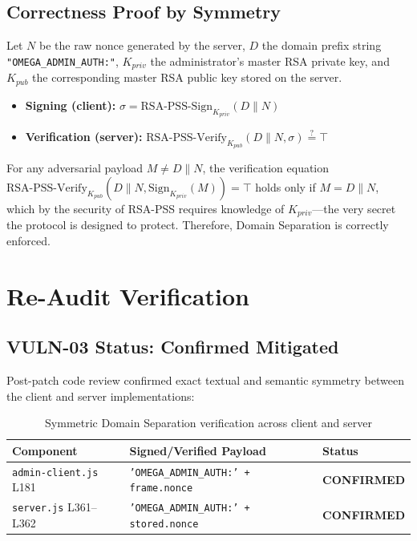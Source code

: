 \documentclass[12pt,a4paper]{article}
\begin{document}
\subsection{Correctness Proof by Symmetry}

Let $N$ be the raw nonce generated by the server, $D$ the domain prefix string \texttt{"OMEGA\_ADMIN\_AUTH:"}, $K_{priv}$ the administrator's master RSA private key, and $K_{pub}$ the corresponding master RSA public key stored on the server.

\begin{itemize}
    \item \textbf{Signing (client):} $\sigma = \text{RSA-PSS-Sign}_{K_{priv}}(D \| N)$
    \item \textbf{Verification (server):} $\text{RSA-PSS-Verify}_{K_{pub}}(D \| N, \sigma) \stackrel{?}{=} \top$
\end{itemize}

For any adversarial payload $M \neq D \| N$, the verification equation $\text{RSA-PSS-Verify}_{K_{pub}}(D \| N, \text{Sign}_{K_{priv}}(M)) = \top$ holds only if $M = D \| N$, which by the security of RSA-PSS requires knowledge of $K_{priv}$---the very secret the protocol is designed to protect. Therefore, Domain Separation is correctly enforced.

\section{Re-Audit Verification}

\subsection{VULN-03 Status: Confirmed Mitigated}

Post-patch code review confirmed exact textual and semantic symmetry between the client and server implementations:

\begin{table}[h!]
\centering
\begin{tabularx}{\textwidth}{lXl}
\toprule
\textbf{Component} & \textbf{Signed/Verified Payload} & \textbf{Status} \\
\midrule
\texttt{admin-client.js} L181 & \texttt{'OMEGA\_ADMIN\_AUTH:' + frame.nonce} & \textcolor{safegreen}{\textbf{CONFIRMED}} \\
\texttt{server.js} L361--L362 & \texttt{'OMEGA\_ADMIN\_AUTH:' + stored.nonce} & \textcolor{safegreen}{\textbf{CONFIRMED}} \\
\bottomrule
\end{tabularx}
\caption{Symmetric Domain Separation verification across client and server}
\end{table}
\end{document}
